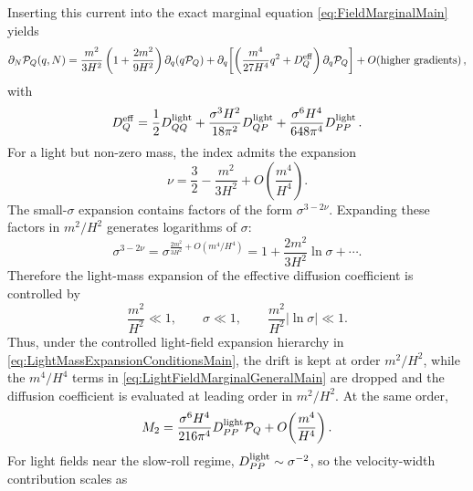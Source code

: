 \documentclass{article}
\numberwithin{equation}{section}
\begin{document}
	Inserting this current into the exact marginal equation \cref{eq:FieldMarginalMain} yields
	\begin{align}
		\partial_N{\cal P}_Q(q,N)
		=
		\frac{m^2}{3H^2}
		\left(
		1+\frac{2m^2}{9H^2}
		\right)
		\partial_q\!\left(q{\cal P}_Q\right)
		+
		\partial_q\!\left[
		\left(
		\frac{m^4}{27H^4}q^2
		+
		D_Q^{\rm eff}
		\right)
		\partial_q{\cal P}_Q
		\right]
		+
		O\!\left(\text{higher gradients}\right),
		\label{eq:LightFieldMarginalGeneralMain}
	\end{align}
	with
	\begin{equation}
		D_Q^{\rm eff}
		=
		\frac12D_{QQ}^{\rm light}
		+
		\frac{\sigma^3H^2}{18\pi^2}D_{QP}^{\rm light}
		+
		\frac{\sigma^6H^4}{648\pi^4}D_{PP}^{\rm light}\, .
		\label{eq:DQEffectiveLightMain}
	\end{equation}
	For a light but non-zero mass, the index admits the expansion
    \begin{equation}
    \nu=\frac32-\frac{m^2}{3H^2}+O\!\left(\frac{m^4}{H^4}\right).
    \label{eq:LightNuExpansionMain}
    \end{equation}
    The small-\(\sigma\) expansion contains factors of the form \(\sigma^{3-2\nu}\). Expanding these factors in \(m^2/H^2\) generates logarithms of \(\sigma\):
    \begin{equation}
    \sigma^{3-2\nu}=\sigma^{\frac{2m^2}{3H^2}+O(m^4/H^4)}=1+\frac{2m^2}{3H^2}\ln\sigma+\cdots .
    \label{eq:LightSigmaNonUniformMain}
    \end{equation}
    Therefore the light-mass expansion of the effective diffusion coefficient is controlled by
	\begin{equation}
		\frac{m^2}{H^2}\ll1,
		\qquad
		\sigma\ll1,
		\qquad
		\frac{m^2}{H^2}|\ln\sigma|\ll1.
		\label{eq:LightMassExpansionConditionsMain}
	\end{equation}
	Thus, under the controlled light-field expansion hierarchy in \cref{eq:LightMassExpansionConditionsMain}, the drift is kept at order \(m^2/H^2\), while the \(m^4/H^4\) terms in \cref{eq:LightFieldMarginalGeneralMain} are dropped and the diffusion coefficient is evaluated at leading order in \(m^2/H^2\). At the same order,
	\begin{equation}
		M_2
		=
		\frac{\sigma^6H^4}{216\pi^4}D_{PP}^{\rm light}{\cal P}_Q
		+
		O\!\left(\frac{m^4}{H^4}\right).
		\label{eq:ProjectedSecondVelocityMomentLeadingMain}
	\end{equation}
	For light fields near the slow-roll regime, \(D_{PP}^{\rm light}\sim\sigma^{-2}\), so the velocity-width contribution scales as
\end{document}
